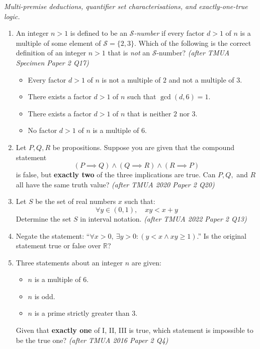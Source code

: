 \documentclass[11pt,a4paper]{article}
\begin{document}
\noindent\textit{Multi-premise deductions, quantifier set characterisations, and exactly-one-true logic.}

\begin{enumerate}

\item An integer $n > 1$ is defined to be an \emph{$\mathcal{S}$-number} if every factor $d > 1$ of $n$ is a multiple of some element of $\mathcal{S} = \{2, 3\}$. Which of the following is the correct definition of an integer $n > 1$ that is \emph{not} an $\mathcal{S}$-number? \textit{\small(after TMUA Specimen Paper 2 Q17)}
\begin{itemize}
\item[A)] Every factor $d > 1$ of $n$ is not a multiple of $2$ and not a multiple of $3$.
\item[B)] There exists a factor $d > 1$ of $n$ such that $\gcd(d, 6) = 1$.
\item[C)] There exists a factor $d > 1$ of $n$ that is neither $2$ nor $3$.
\item[D)] No factor $d > 1$ of $n$ is a multiple of $6$.
\end{itemize}

\item Let $P, Q, R$ be propositions. Suppose you are given that the compound statement
\[
(P \implies Q) \land (Q \implies R) \land (R \implies P)
\]
is false, but \textbf{exactly two} of the three implications are true. Can $P, Q,$ and $R$ all have the same truth value? \textit{\small(after TMUA 2020 Paper 2 Q20)}

\item Let $S$ be the set of real numbers $x$ such that:
\[
\forall y \in (0, 1),\quad xy < x + y
\]
Determine the set $S$ in interval notation. \textit{\small(after TMUA 2022 Paper 2 Q13)}

\item Negate the statement: ``$\forall x > 0,\ \exists y > 0 : (y < x \land xy \ge 1)$.'' Is the original statement true or false over $\mathbb{R}$?

\item Three statements about an integer $n$ are given:
\begin{itemize}
\item[I.] $n$ is a multiple of $6$.
\item[II.] $n$ is odd.
\item[III.] $n$ is a prime strictly greater than $3$.
\end{itemize}
Given that \textbf{exactly one} of I, II, III is true, which statement is impossible to be the true one? \textit{\small(after TMUA 2016 Paper 2 Q4)}


\end{enumerate}
\end{document}
